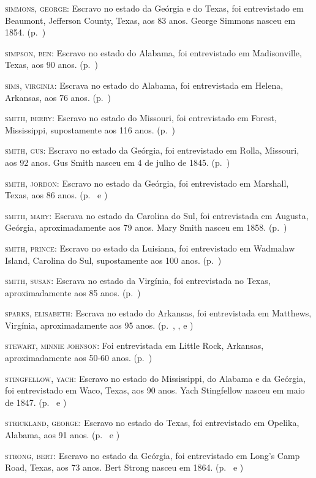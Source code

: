 \begin{Parskip}
\textsc{simmons, george:} Escravo no estado da Geórgia e do Texas, foi
entrevistado em Beaumont, Jefferson County, Texas, aos 83 anos. George
Simmons nasceu em 1854. (p.~\pageref{ref239})

\textsc{simpson, ben:} Escravo no estado do Alabama, foi entrevistado em
Madisonville, Texas, aos 90 anos. (p.~\pageref{ref240})

\textsc{sims, virginia:} Escrava no estado do Alabama, foi entrevistada
em Helena, Arkansas, aos 76 anos. (p.~\pageref{ref241})

\textsc{smith, berry:} Escravo no estado do Missouri, foi entrevistado
em Forest, Mississippi, supostamente aos 116 anos. (p.~\pageref{ref242})

\textsc{smith, gus:} Escravo no estado da Geórgia, foi entrevistado em
Rolla, Missouri, aos 92 anos. Gus Smith nasceu em 4 de julho de 1845. (p.~\pageref{ref243})

\textsc{smith, jordon:} Escravo no estado da Geórgia, foi entrevistado
em Marshall, Texas, aos 86 anos. (p.~\pageref{ref244} e \pageref{ref245})

\textsc{smith, mary:} Escrava no estado da Carolina do Sul, foi
entrevistada em Augusta, Geórgia, aproximadamente aos 79 anos. Mary
Smith nasceu em 1858. (p.~\pageref{ref246})

\textsc{smith, prince:} Escravo no estado da Luisiana, foi entrevistado
em Wadmalaw Island, Carolina do Sul, supostamente aos 100 anos. (p.~\pageref{ref247})

\textsc{smith, susan:} Escrava no estado da Virgínia, foi entrevistada
no Texas, aproximadamente aos 85 anos. (p.~\pageref{ref248})

\textsc{sparks, elisabeth:} Escrava no estado do Arkansas, foi
entrevistada em Matthews, Virgínia, aproximadamente aos 95 anos. (p.~\pageref{ref249}, \pageref{ref250}, \pageref{ref251} e \pageref{ref252})

\textsc{stewart, minnie johnson:} Foi entrevistada em Little Rock,
Arkansas, aproximadamente aos 50-60 anos. (p.~\pageref{ref253})

\textsc{stingfellow, yach:} Escravo no estado do Mississippi, do Alabama
e da Geórgia, foi entrevistado em Waco, Texas, aos 90 anos. Yach
Stingfellow nasceu em maio de 1847. (p.~\pageref{ref254} e \pageref{ref255})

\textsc{strickland, george:} Escravo no estado do Texas, foi
entrevistado em Opelika, Alabama, aos 91 anos. (p.~\pageref{ref256} e \pageref{ref257})

\textsc{strong, bert:} Escravo no estado da Geórgia, foi entrevistado em
Long's Camp Road, Texas, aos 73 anos. Bert Strong nasceu em 1864. (p.~\pageref{ref258} e \pageref{ref259})


\end{Parskip}

